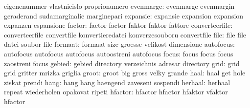                            eigenenummer              vlastnicislo
                           proprionumero             %
                evenmarge: evenmarge                 evenmargin
                           geraderand                sudamarginalie
                           marginepari
                 expansie: expansie                  expansion
                           expansion                 expanzen
                           espansione
                   factor: factor                    factor
                           faktor                    faktor
                           fattore
           converteerfile: converteerfile            convertfile
                           konvertieredatei          konverzesouboru
                           convertfile               %
                     file: file                      file
                           datei                     soubor
                           file
                  formaat: formaat                   size
                           groesse                   velikost
                           dimensione
                autofocus: autofocus                 autofocus
                           autofocus                 autoostreni
                           autofocus
                    focus: focus                     focus
                           focus                     zaostreni
                           focus                     %
                   gebied: gebied                    directory
                           verzeichnis               adresar
                           directory %
                     grid: grid                      grid
                           gritter                   mrizka
                           griglia
                    groot: groot                     big
                           gross                     velky
                           grande
                     haal: haal                      get
                           hole                      ziskat
                           prendi
                     hang: hang                      hang
                           haengend                  zaveseni
                           sospendi                  %
                  herhaal: herhaal                   repeat
                           wiederholen               opakovat
                           ripeti                    %
                  hfactor: hfactor                   hfactor
                           hfaktor                   vfaktor
                           hfactor                   %
